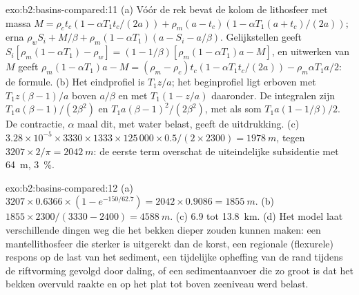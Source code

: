 \begin{solution}{exo:b2:basins-compared:11}
(a) Vóór de rek bevat de kolom de lithosfeer met massa $M = \rho_c t_c(1 - \alpha T_1
t_c/(2a)) + \rho_m(a - t_c)(1 - \alpha T_1(a + t_c)/(2a))$; erna $\rho_w S_i + M/\beta +
\rho_m(1 - \alpha T_1)(a - S_i - a/\beta)$. Gelijkstellen geeft $S_i[\rho_m(1 - \alpha T_1) - \rho_w] =
(1 - 1/\beta)[\rho_m(1 - \alpha T_1)a - M]$, en uitwerken van $M$ geeft $\rho_m(1 - \alpha T_1)a - M =
(\rho_m - \rho_c)t_c(1 - \alpha T_1 t_c/(2a)) - \rho_m\alpha T_1 a/2$: de formule. (b) Het eindprofiel is $T_1 z/a$; het beginprofiel ligt erboven
met $T_1 z(\beta - 1)/a$ boven $a/\beta$ en met $T_1(1 - z/a)$ daaronder. De integralen zijn $T_1
a(\beta - 1)/(2\beta^2)$ en $T_1 a(\beta - 1)^2/(2\beta^2)$, met als som $T_1 a(1 - 1/\beta)/2$.
De contractie, $\alpha$ maal dit, met water belast, geeft de uitdrukking. (c) $3.28\times10^{-5}
\times3330\times1333\times125\,000\times0.5/(2\times2300) = \qty{1978}{m}$, tegen $3207\times
2/\pi = \qty{2042}{m}$: de eerste term overschat de uiteindelijke subsidentie met \qty{64}{m},
\qty{3}{\percent}.
\end{solution}

\begin{solution}{exo:b2:basins-compared:12}
(a) $3207\times0.6366\times(1 - e^{-150/62.7}) = 2042\times0.9086 = \qty{1855}{m}$. (b) $1855\times
2300/(3330 - 2400) = \qty{4588}{m}$. (c) 6.9 tot \qty{13.8}{km}. (d) Het model laat verschillende
dingen weg die het bekken dieper zouden kunnen maken: een mantellithosfeer die sterker is uitgerekt dan de korst, een regionale
(flexurele) respons op de last van het sediment, een tijdelijke opheffing van de rand tijdens de riftvorming
gevolgd door daling, of een sedimentaanvoer die zo groot is dat het bekken overvuld raakte en op het plat
tot boven zeeniveau werd belast.
\end{solution}

